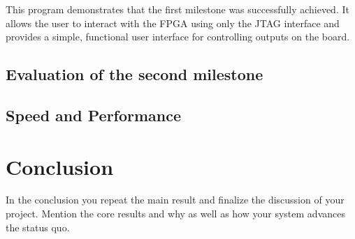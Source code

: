 \documentclass[a4paper,11pt,oneside]{report}
\begin{document}
This program demonstrates that the first milestone was successfully achieved.  
It allows the user to interact with the FPGA using only the JTAG interface and provides a simple, functional user interface for controlling outputs on the board.

\section{Evaluation of the second milestone}


\section{Speed and Performance}



\chapter{Conclusion}

In the conclusion you repeat the main result and finalize the discussion of
your project. Mention the core results and why as well as how your system
advances the status quo.

\cleardoublepage
{}
{}
\printbibliography

%
%
\end{document}
